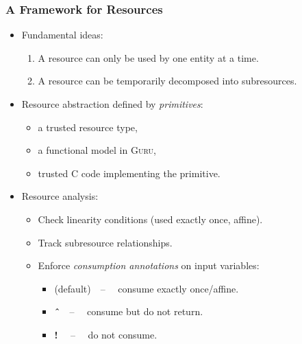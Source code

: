 \documentclass[10pt]{beamer}
\begin{document}
\begin{frame}
  \frametitle{A Framework for Resources}

\begin{itemize}

\item Fundamental ideas:

\begin{enumerate}
\item A resource can only be used by one entity at a time.
\item A resource can be temporarily decomposed into subresources.
\end{enumerate}

\item Resource abstraction defined by \emph{primitives}:

\begin{itemize}
\item a trusted resource type,
\item a functional model in \textsc{Guru},
\item trusted C code implementing the primitive.
\end{itemize}

\item Resource analysis:
\begin{itemize}
\item Check linearity conditions (used exactly once, affine).
\item Track subresource relationships.
\item Enforce \emph{consumption annotations} on input variables:
\begin{itemize}
\item (default)\ \ -- \ \ consume exactly once/affine.
\item \textbf{\^{\ }}\ \ -- \ \  consume but do not return.
\item \textbf{!} \ \ -- \ \  do not consume.
\end{itemize}
\end{itemize}

\end{itemize}

\end{frame}
\end{document}
